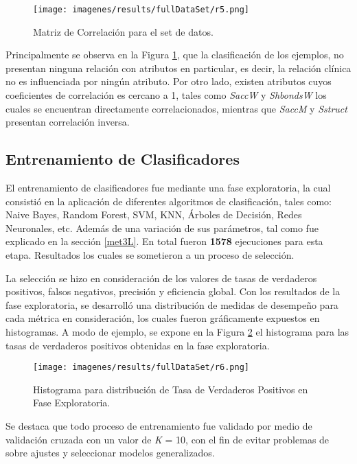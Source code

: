 \begin{figure}[!h]
	\centering
	\texttt{[image: imagenes/results/fullDataSet/r5.png]}
	\caption{Matriz de Correlaci\'on para el set de datos.}
	\label{res4}
\end{figure}


Principalmente se observa en la Figura \ref{res4}, que la clasificaci\'on de los ejemplos, no presentan ninguna relaci\'on con atributos en particular, es decir, la relaci\'on cl\'inica no es influenciada por ning\'un atributo. Por otro lado, existen atributos cuyos coeficientes de correlaci\'on es cercano a 1, tales como \textit{SaccW} y \textit{ShbondsW} los cuales se encuentran directamente correlacionados, mientras que \textit{SaccM} y \textit{Sstruct} presentan correlaci\'on inversa.

\subsection{Entrenamiento de Clasificadores}

El entrenamiento de clasificadores fue mediante una fase exploratoria, la cual consisti\'o en la aplicaci\'on de diferentes algoritmos de clasificaci\'on, tales como: Naive Bayes, Random Forest, SVM, KNN, \'Arboles de Decisi\'on, Redes Neuronales, etc.  Adem\'as de  una variaci\'on de sus par\'ametros, tal como fue explicado en la secci\'on \ref{met3L}. En total fueron \textbf{1578} ejecuciones para esta etapa. Resultados los cuales se sometieron a un proceso de selecci\'on.

La selecci\'on se hizo en consideraci\'on de los valores de tasas de verdaderos positivos, falsos negativos, precisi\'on y eficiencia global. Con los resultados de la fase exploratoria, se desarroll\'o una distribuci\'on de medidas de desempe\~no para cada m\'etrica en consideraci\'on, los cuales fueron gr\'aficamente expuestos en histogramas. A modo de ejemplo, se expone en la Figura \ref{res5} el histograma para las tasas de verdaderos positivos obtenidas en la fase exploratoria.

\begin{figure}[!h]
	\centering
	\texttt{[image: imagenes/results/fullDataSet/r6.png]}
	\caption{Histograma para distribuci\'on de Tasa de Verdaderos Positivos en Fase Exploratoria.}
	\label{res5}
\end{figure}

Se destaca que todo proceso de entrenamiento fue validado por medio de validaci\'on cruzada con un valor de \textit{K} = 10, con el fin de evitar problemas de sobre ajustes y seleccionar modelos generalizados.

